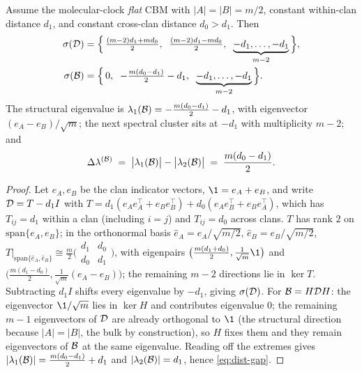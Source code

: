 \begin{proposition}\label{prop:G-spectrum}
Assume the molecular-clock \emph{flat} CBM with $|A|=|B|=m/2$, constant
within-clan distance $d_1$, and constant cross-clan distance $d_0>d_1$. Then
\begin{align}
   \sigma(\mathcal{D}) &= \Bigl\{\,\tfrac{(m-2)d_1+md_0}{2},\;\; \tfrac{(m-2)d_1-md_0}{2},\;\;
                  \underbrace{-d_1,\dots,-d_1}_{m-2}\,\Bigr\}, \\
   \sigma(\mathcal{B}) &= \Bigl\{\,0,\;\; -\tfrac{m(d_0-d_1)}{2}-d_1,\;\;
                 \underbrace{-d_1,\dots,-d_1}_{m-2}\,\Bigr\}.
\end{align}
The structural eigenvalue is $\lambda_1(\mathcal{B})=-\tfrac{m(d_0-d_1)}2-d_1$, with
eigenvector $(e_A-e_B)/\sqrt m$; the next spectral cluster sits at $-d_1$ with
multiplicity $m-2$; and
\begin{equation}\label{eq:dist-gap}
   \Delta\lambda^{(\mathcal{B})} \;=\; \bigl|\lambda_1(\mathcal{B})\bigr|-\bigl|\lambda_2(\mathcal{B})\bigr|
             \;=\; \frac{m(d_0-d_1)}{2}.
\end{equation}
\end{proposition}
\begin{proof}
Let $e_A,e_B$ be the clan indicator vectors, $\1=e_A+e_B$, and write
$\mathcal{D}=T-d_1 I$ with $T=d_1(e_Ae_A^\top+e_Be_B^\top)+d_0(e_Ae_B^\top+e_Be_A^\top)$,
which has $T_{ij}=d_1$ within a clan (including $i=j$) and $T_{ij}=d_0$
across clans. $T$ has rank $2$ on $\mathrm{span}\{e_A,e_B\}$; in the
orthonormal basis $\hat e_A=e_A/\sqrt{m/2}$, $\hat e_B=e_B/\sqrt{m/2}$,
$T|_{\mathrm{span}\{\hat e_A,\hat e_B\}}\cong\tfrac m2\bigl(\begin{smallmatrix}d_1&d_0\\d_0&d_1\end{smallmatrix}\bigr)$,
with eigenpairs $\bigl(\tfrac{m(d_1+d_0)}2,\tfrac1{\sqrt m}\1\bigr)$ and
$\bigl(\tfrac{m(d_1-d_0)}2,\tfrac1{\sqrt m}(e_A-e_B)\bigr)$; the remaining
$m-2$ directions lie in $\ker T$. Subtracting $d_1 I$ shifts every eigenvalue
by $-d_1$, giving $\sigma(\mathcal{D})$. For $\mathcal{B}=H\mathcal{D} H$: the eigenvector
$\1/\sqrt m$ lies in $\ker H$ and contributes eigenvalue $0$; the remaining
$m-1$ eigenvectors of $\mathcal{D}$ are already orthogonal to $\1$ (the structural
direction because $|A|=|B|$, the bulk by construction), so $H$ fixes them and
they remain eigenvectors of $\mathcal{B}$ at the same eigenvalue. Reading off the
extremes gives $|\lambda_1(\mathcal{B})|=\tfrac{m(d_0-d_1)}2+d_1$ and
$|\lambda_2(\mathcal{B})|=d_1$, hence \eqref{eq:dist-gap}.
\end{proof}


